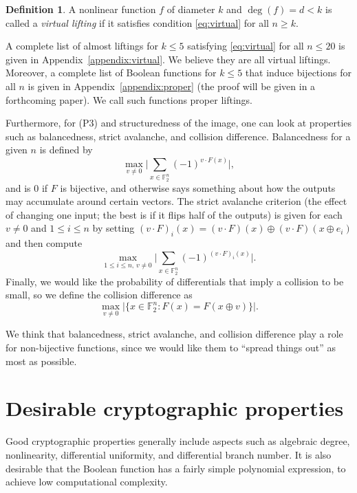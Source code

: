 \documentclass[11pt,english,a4paper]{amsart}
\theoremstyle{plain}
\theoremstyle{definition}
\newtheorem{definition}[theorem]{Definition}
\theoremstyle{remark}
\newcommand{\F}{\mathbb{F}}
\begin{document}
	\begin{definition}
		A nonlinear function $f$ of diameter $k$ and $\operatorname{deg}(f)=d<k$ is called a \emph{virtual lifting} if it satisfies condition \eqref{eq:virtual} for all $n\geq k$.
	\end{definition}
 
	A complete list of almost liftings for $k\leq 5$ satisfying \eqref{eq:virtual} for all $n\leq 20$ is given in Appendix~\ref{appendix:virtual}. We believe they are all virtual liftings. Moreover, a complete list of Boolean functions for $k\leq 5$ that induce bijections for all $n$ is given in Appendix~\ref{appendix:proper} (the proof will be given in a forthcoming paper). We call such functions proper liftings.
    
	\medskip
	
	Furthermore, for (P3) and structuredness of the image, one can look at properties such as balancedness, strict avalanche, and collision difference. Balancedness for a given $n$ is defined by
	\[
	\max_{v\neq 0} \lvert\sum_{x\in\F_2^n}(-1)^{v\cdot F(x)}\rvert,
	\]
	and is $0$ if $F$ is bijective, and otherwise says something about how the outputs may accumulate around certain vectors.
	The strict avalanche criterion (the effect of changing one input; the best is if it flips half of the outputs) is given for each $v\neq 0$ and $1\leq i\leq n$ by setting $(v\cdot F)_i(x)=(v\cdot F)(x)\oplus(v\cdot F)(x\oplus e_i)$ and then compute
	\[
	\max_{1\leq i\leq n,\, v\neq 0} \lvert\sum_{x\in\F_2^n}(-1)^{(v\cdot F)_i(x)}\rvert.
	\]
    Finally, we would like the probability of differentials that imply a collision to be small, so we define the collision difference as
    \[
    \max_{v\neq 0}\lvert\{ x\in \F_2^n : F(x)=F(x\oplus v)\}\rvert.
    \]
 
	We think that balancedness, strict avalanche, and collision difference play a role for non-bijective functions, since we would like them to ``spread things out'' as most as possible.
	
	\section{Desirable cryptographic properties}
	
	Good cryptographic properties generally include aspects such as algebraic degree, nonlinearity, differential uniformity, and differential branch number. It is also desirable that the Boolean function has a fairly simple polynomial expression, to achieve low computational complexity.
	
\end{document}
